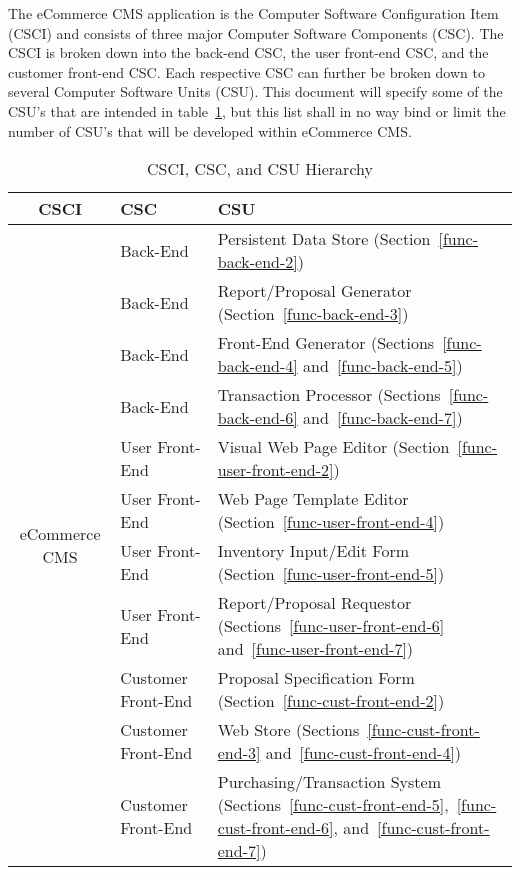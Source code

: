 \documentclass{article}
\begin{document}
The eCommerce CMS application is the Computer Software Configuration Item
(CSCI) and consists of three major Computer Software Components (CSC).  The
CSCI is broken down into the back-end CSC, the user front-end CSC, and the
customer front-end CSC.  Each respective CSC can further be broken down to
several Computer Software Units (CSU).  This document will specify some of the
CSU's that are intended in table~\ref{software-hierarchy}, but this list shall
in no way bind or limit the number of CSU's that will be developed within
eCommerce CMS.

\begin{table}
    \begin{tabular}{|c|l|p{8.5cm}|}\hline
        CSCI & CSC & CSU \\\hline\hline
        \multirow{12}{*}{eCommerce CMS}
         & Back-End & Persistent Data Store (Section~\ref{func-back-end-2}) \\\cline{2-3}
         & Back-End & Report/Proposal Generator (Section~\ref{func-back-end-3}) \\\cline{2-3}
         & Back-End & Front-End Generator (Sections~\ref{func-back-end-4} and~\ref{func-back-end-5}) \\\cline{2-3}
         & Back-End & Transaction Processor (Sections~\ref{func-back-end-6} and~\ref{func-back-end-7}) \\\cline{2-3}
         & User Front-End & Visual Web Page Editor (Section~\ref{func-user-front-end-2}) \\\cline{2-3}
         & User Front-End & Web Page Template Editor (Section~\ref{func-user-front-end-4}) \\\cline{2-3}
         & User Front-End & Inventory Input/Edit Form (Section~\ref{func-user-front-end-5}) \\\cline{2-3}
         & User Front-End & Report/Proposal Requestor (Sections~\ref{func-user-front-end-6} and~\ref{func-user-front-end-7}) \\\cline{2-3}
         & Customer Front-End & Proposal Specification Form (Section~\ref{func-cust-front-end-2}) \\\cline{2-3}
         & Customer Front-End & Web Store (Sections~\ref{func-cust-front-end-3} and~\ref{func-cust-front-end-4}) \\\cline{2-3}
         & Customer Front-End & Purchasing/Transaction System (Sections~\ref{func-cust-front-end-5},~\ref{func-cust-front-end-6}, and~\ref{func-cust-front-end-7}) \\\hline
    \end{tabular}
    \caption{CSCI, CSC, and CSU Hierarchy}
    \label{software-hierarchy}
\end{table}
\end{document}
